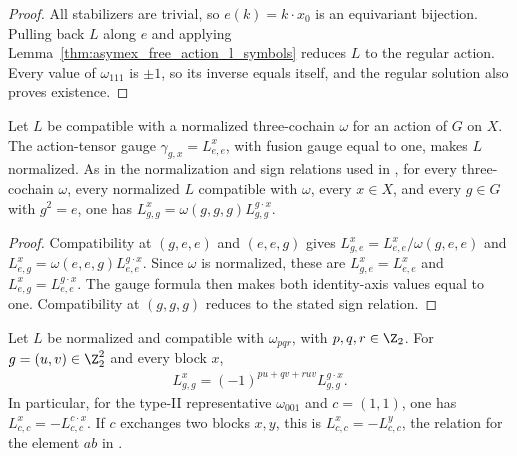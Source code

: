 \begin{proof}
    \leanok
    All stabilizers are trivial, so $e(k)=k\cdot x_0$ is an equivariant
    bijection. Pulling back $L$ along $e$ and applying
    Lemma~\ref{thm:asymex_free_action_l_symbols} reduces $L$ to the regular
    action. Every value of $\omega_{111}$ is $\pm1$, so its inverse equals
    itself, and the regular solution also proves existence.
\end{proof}

\begin{lemma}
    \label{thm:asymex_l_symbol_normalization}
    \leanok
    Let $L$ be compatible with a normalized three-cochain $\omega$ for an
    action of $G$ on $X$. The action-tensor gauge
    $\gamma_{g,x}=L^x_{e,e}$, with fusion gauge equal to one, makes $L$
    normalized. As in the normalization and sign relations used in
    \cite[Section~6]{GarreRubio2023MPOSym}, for every three-cochain $\omega$,
    every normalized $L$ compatible with $\omega$, every $x\in X$, and every
    $g\in G$ with $g^2=e$, one has
    $L^x_{g,g}=\omega(g,g,g)L^{g\cdot x}_{g,g}$.
\end{lemma}

\begin{proof}
    \leanok
    Compatibility at $(g,e,e)$ and $(e,e,g)$ gives
    $L^x_{g,e}=L^x_{e,e}/\omega(g,e,e)$ and
    $L^x_{e,g}=\omega(e,e,g)L^{g\cdot x}_{e,e}$. Since $\omega$ is normalized,
    these are $L^x_{g,e}=L^x_{e,e}$ and $L^x_{e,g}=L^{g\cdot x}_{e,e}$.
    The gauge formula then makes both identity-axis values equal to one.
    Compatibility at $(g,g,g)$ reduces to the stated sign relation.
\end{proof}

\begin{lemma}
    \label{thm:asymex_klein_l_symbol_signs}
    \leanok
    Let $L$ be normalized and compatible with $\omega_{pqr}$, with
    $p,q,r\in\Z_2$. For $g=(u,v)\in\Z_2^2$ and every block $x$,
    \begin{align}
        \label{eq:asymex_klein_l_sign}
        L^x_{g,g}=(-1)^{pu+qv+ruv}L^{g\cdot x}_{g,g}.
    \end{align}
    In particular, for the type-II representative $\omega_{001}$ and
    $c=(1,1)$, one has $L^x_{c,c}=-L^{c\cdot x}_{c,c}$.
    If $c$ exchanges two blocks $x,y$, this is
    $L^x_{c,c}=-L^y_{c,c}$, the relation for the element $ab$ in
    \cite[Section~6]{GarreRubio2023MPOSym}.
\end{lemma}

